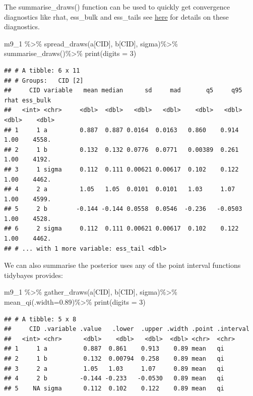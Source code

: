 \documentclass[
]{book}
\newenvironment{Shaded}{\begin{snugshade}}{\end{snugshade}}
\newcommand{\AttributeTok}[1]{\textcolor[rgb]{0.77,0.63,0.00}{#1}}
\newcommand{\DecValTok}[1]{\textcolor[rgb]{0.00,0.00,0.81}{#1}}
\newcommand{\FloatTok}[1]{\textcolor[rgb]{0.00,0.00,0.81}{#1}}
\newcommand{\FunctionTok}[1]{\textcolor[rgb]{0.00,0.00,0.00}{#1}}
\newcommand{\NormalTok}[1]{#1}
\newcommand{\SpecialCharTok}[1]{\textcolor[rgb]{0.00,0.00,0.00}{#1}}
\begin{document}
The summarise\_draws() function can be used to quickly get convergence diagnostics like rhat, ess\_bulk and ess\_tails see \href{https://mc-stan.org/rstan/reference/Rhat.html}{here} for details on these diagnostics.

\begin{Shaded}
\begin{Highlighting}[]
\NormalTok{m9\_1 }\SpecialCharTok{\%\textgreater{}\%} 
  \FunctionTok{spread\_draws}\NormalTok{(a[CID], b[CID], sigma)}\SpecialCharTok{\%\textgreater{}\%}
  \FunctionTok{summarise\_draws}\NormalTok{()}\SpecialCharTok{\%\textgreater{}\%}
  \FunctionTok{print}\NormalTok{(}\AttributeTok{digits =} \DecValTok{3}\NormalTok{)}
\end{Highlighting}
\end{Shaded}

\begin{verbatim}
## # A tibble: 6 x 11
## # Groups:   CID [2]
##     CID variable   mean median      sd     mad       q5     q95  rhat ess_bulk
##   <int> <chr>     <dbl>  <dbl>   <dbl>   <dbl>    <dbl>   <dbl> <dbl>    <dbl>
## 1     1 a         0.887  0.887 0.0164  0.0163   0.860    0.914   1.00    4558.
## 2     1 b         0.132  0.132 0.0776  0.0771   0.00389  0.261   1.00    4192.
## 3     1 sigma     0.112  0.111 0.00621 0.00617  0.102    0.122   1.00    4462.
## 4     2 a         1.05   1.05  0.0101  0.0101   1.03     1.07    1.00    4599.
## 5     2 b        -0.144 -0.144 0.0558  0.0546  -0.236   -0.0503  1.00    4528.
## 6     2 sigma     0.112  0.111 0.00621 0.00617  0.102    0.122   1.00    4462.
## # ... with 1 more variable: ess_tail <dbl>
\end{verbatim}

We can also summarise the posterior uses any of the point interval functions tidybayes provides:

\begin{Shaded}
\begin{Highlighting}[]
\NormalTok{m9\_1 }\SpecialCharTok{\%\textgreater{}\%} 
  \FunctionTok{gather\_draws}\NormalTok{(a[CID], b[CID], sigma)}\SpecialCharTok{\%\textgreater{}\%}
  \FunctionTok{mean\_qi}\NormalTok{(}\AttributeTok{.width=}\FloatTok{0.89}\NormalTok{)}\SpecialCharTok{\%\textgreater{}\%}
  \FunctionTok{print}\NormalTok{(}\AttributeTok{digits =} \DecValTok{3}\NormalTok{)}
\end{Highlighting}
\end{Shaded}

\begin{verbatim}
## # A tibble: 5 x 8
##     CID .variable .value   .lower  .upper .width .point .interval
##   <int> <chr>      <dbl>    <dbl>   <dbl>  <dbl> <chr>  <chr>    
## 1     1 a          0.887  0.861    0.913    0.89 mean   qi       
## 2     1 b          0.132  0.00794  0.258    0.89 mean   qi       
## 3     2 a          1.05   1.03     1.07     0.89 mean   qi       
## 4     2 b         -0.144 -0.233   -0.0530   0.89 mean   qi       
## 5    NA sigma      0.112  0.102    0.122    0.89 mean   qi
\end{verbatim}
\end{document}
